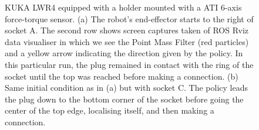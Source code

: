 \documentclass[final,3p,times,twocolumn]{elsarticle}
\begin{document}
\begin{figure}
 \centering
 \caption{KUKA LWR4 equipped with a holder mounted with a ATI 6-axis force-torque sensor. (a) The robot's end-effector starts to the 
 right of socket A. The second row shows screen captures taken of ROS Rviz data visualiser in which we see the Point Mass Filter 
 (red particles) and a yellow arrow indicating the direction given by the policy. In this particular run, the plug remained in contact with the ring of the socket until 
 the top was reached before making a connection. (b) Same initial condition as in (a) but with socket C. The policy leads the plug down to 
 the bottom corner of the socket before going the center of the top edge, localising itself, and then making a connection.}
 \label{fig:real_pictures}
\end{figure}
\end{document}
